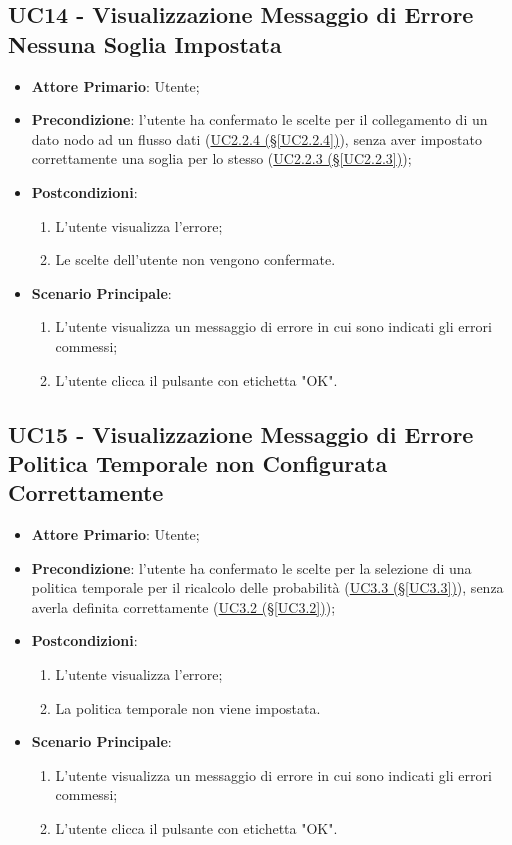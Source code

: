 \subsection{UC14 - Visualizzazione Messaggio di Errore Nessuna Soglia Impostata}\label{UC14}
\begin{itemize}
\item \textbf{Attore Primario}: Utente;
\item \textbf{Precondizione}: l'utente ha confermato le scelte per il collegamento di un dato nodo ad un flusso 				dati (\hyperref[UC2.2.4]{UC2.2.4 (§\ref*{UC2.2.4})}), senza aver impostato correttamente una soglia per lo stesso 	(\hyperref[UC2.2.3]{UC2.2.3 (§\ref*{UC2.2.3})});
\item \textbf{Postcondizioni}: 
	\begin{enumerate}
	\item L'utente visualizza l'errore;
	\item Le scelte dell'utente non vengono confermate.
	\end{enumerate}
\item \textbf{Scenario Principale}: 
	\begin{enumerate}
	\item L'utente visualizza un messaggio di errore in cui sono indicati gli errori commessi;
	\item L'utente clicca il pulsante con etichetta "OK".
	\end{enumerate}
\end{itemize}

\pagebreak

\subsection{UC15 - Visualizzazione Messaggio di Errore Politica Temporale non Configurata Correttamente}\label{UC15}
\begin{itemize}
\item \textbf{Attore Primario}: Utente;
\item \textbf{Precondizione}: l'utente ha confermato le scelte per la selezione di una politica temporale per il ricalcolo delle probabilità (\hyperref[UC3.3]{UC3.3 (§\ref*{UC3.3})}), senza averla definita correttamente (\hyperref[UC3.2]{UC3.2 (§\ref*{UC3.2})});
\item \textbf{Postcondizioni}: 
	\begin{enumerate}
	\item L'utente visualizza l'errore;
	\item La politica temporale non viene impostata.
	\end{enumerate}
\item \textbf{Scenario Principale}: 
	\begin{enumerate}
	\item L'utente visualizza un messaggio di errore in cui sono indicati gli errori commessi;
	\item L'utente clicca il pulsante con etichetta "OK".
	\end{enumerate}
\end{itemize}

